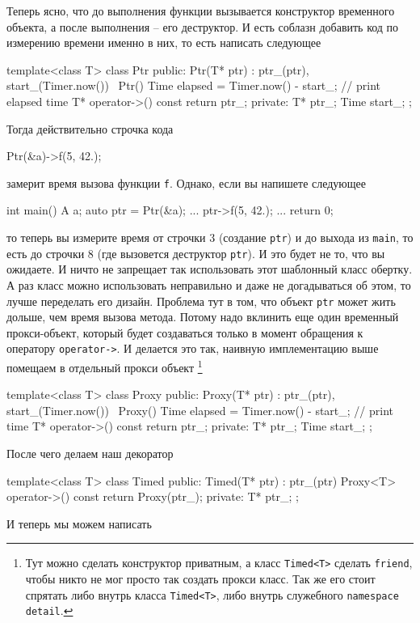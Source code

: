 Теперь ясно, что до выполнения функции вызывается конструктор временного объекта, а после выполнения -- его деструктор.
И есть соблазн добавить код по измерению времени именно в них, то есть написать следующее
\begin{cppcode}
template<class T>
class Ptr {
public:
  Ptr(T* ptr) : ptr_(ptr), start_(Timer.now()) {}
  ~Ptr() {
    Time elapsed = Timer.now() - start_;
    // print elapsed time
  }
  T* operator->() const {
    return ptr_;
  }
private:
  T* ptr_;
  Time start_;
};
\end{cppcode}
Тогда действительно строчка кода
\begin{cppcode}
Ptr(&a)->f(5, 42.);
\end{cppcode}
замерит время вызова функции \verb"f".
Однако, если вы напишете следующее
\begin{cppcode}
int main() {
  A a;
  auto ptr = Ptr(&a);
  ...
  ptr->f(5, 42.);
  ...
  return 0;
}
\end{cppcode}
то теперь вы измерите время от строчки 3 (создание \verb"ptr") и до выхода из \verb"main", то есть до строчки 8 (где вызовется деструктор \verb"ptr").
И это будет не то, что вы ожидаете.
И ничто не запрещает так использовать этот шаблонный класс обертку.
А раз класс можно использовать неправильно и даже не догадываться об этом, то лучше переделать его дизайн.
Проблема тут в том, что объект \verb"ptr" может жить дольше, чем время вызова метода.
Потому надо вклинить еще один временный прокси-объект, который будет создаваться только в момент обращения к оператору \verb"operator->".
И делается это так, наивную имплементацию выше помещаем в отдельный прокси объект%
\footnote{Тут можно сделать конструктор приватным, а класс \verb"Timed<T>" сделать \verb"friend", чтобы никто не мог просто так создать прокси класс.
Так же его стоит спрятать либо внутрь класса \verb"Timed<T>", либо внутрь служебного \verb"namespace detail".}
\begin{cppcode}
template<class T>
class Proxy {
public:
  Proxy(T* ptr) : ptr_(ptr), start_(Timer.now()) {}
  ~Proxy() {
    Time elapsed = Timer.now() - start_;
    // print time
  }
  T* operator->() const {
    return ptr_;
  }
private:
  T* ptr_;
  Time start_;
};
\end{cppcode}
После чего делаем наш декоратор
\begin{cppcode}
template<class T>
class Timed {
public:
  Timed(T* ptr) : ptr_(ptr) {}
  Proxy<T> operator->() const {
    return Proxy(ptr_);
  }
private:
  T* ptr_;
};
\end{cppcode}
И теперь мы можем написать
